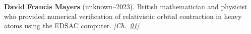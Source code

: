 \textbf{David Francis Mayers} (unknown–2023). British mathematician and physicist who provided numerical verification of relativistic orbital contraction in heavy atoms using the EDSAC computer. \emph{[Ch.~\hyperref[ch:goldrelativity]{01}]}

